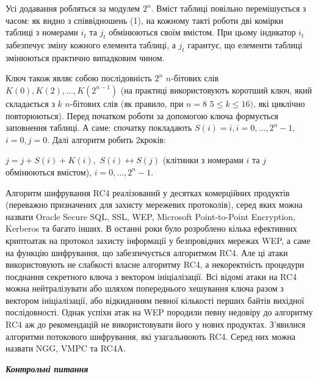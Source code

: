 {{{\bigskip

Усі додавання робляться за модулем  $2^n$. Вміст таблиці повільно
перемішується з часом: як видно з співвідношень (1), на кожному такті роботи
дві комірки таблиці з номерами  $i_t$ та  $j_t$ обмінюються своїм
вмістом. При цьому індикатор  $i_t$ забезпечує зміну кожного елемента
таблиці, а  $j_t$ гарантує, що елементи таблиці змінюються практично
випадковим чином.

Ключ також  являє собою послідовність  $2^n$   $n$-бітових слів 
$K(0),K(2),\dots,K(2^{n-1})$ (на практиці використовують
коротший ключ, який складається з  $k$ $n$-бітових слів (як правило, при 
$n=8$  $5\le k\le 16)$, які циклічно повторюються). Перед початком
роботи за допомогою ключа формується заповнення таблиці. А саме: спочатку
покладають  $S(i)=i,i=0,\dots,2^n-1,$  $i=0,j=0$.
Далі алгоритм робить 2\textsuperscriptn кроків: 

 $j=j+S(i)+K(i),$   $S(i)\leftrightarrow S(j)$ (клітинки з номерами  $i$
та  $j$ обмінюються вмістом),  $i=0,\dots,2^n-1$.

Алгоритм шифрування RC4 реалізований у  десятках комерційних продуктів
(переважно призначених для захисту мережевих протоколів), серед яких можна
назвати Oracle Secure SQL, SSL, WEP, Microsoft Point{}-to{}-Point Encryption,
Kerberos та багато інших. В останні роки було розроблено кілька ефективних
криптоатак на протокол захисту інформації у безпровідних мережах WEP, а саме на
функцію шифрування, що забезпечується алгоритмом RC4. Але ці атаки
використовують не слабкості власне  алгоритму RC4, а  некоректність процедури
поєднання секретного ключа з вектором  ініціалізації. Всі відомі атаки на RC4
можна нейтралізувати або шляхом попереднього хешування ключа разом з вектором
ініціалізації, або відкиданням певної кількості перших байтів вихідної
послідовності. Однак успіхи атак на  WEP породили певну недовіру до алгоритму
RC4 аж до рекомендацій не використовувати його у нових продуктах. З’явилися
алгоритми потокового шифрування, які узагальнюють  RC4. Серед них можна назвати
NGG, VMPC та RC4A.  


\bigskip


\bigskip


\bigskip


\bigskip

{\centering\bfseries\itshape
Контрольні питання
\par}


\bigskip


\bigskip

}}}

